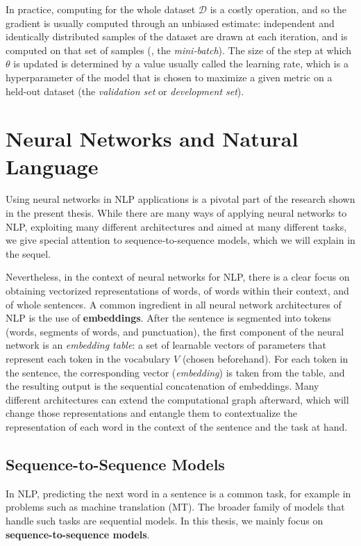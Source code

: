 In practice, computing  for the whole dataset
$\mathcal D$ is a costly operation, and so the gradient is usually
computed through an unbiased estimate: independent and identically
distributed samples of the dataset are drawn at each iteration, and 
is computed on that set of samples (\ie, the \textit{mini-batch}).
The size of the step at which $\theta$ is updated is determined by a value usually called the learning rate,
which is a hyperparameter of the model that is chosen to maximize a given metric on a held-out
dataset (the \textit{validation set} or \textit{development set}).

\section{Neural Networks and Natural Language}

\noindent Using neural networks in NLP applications is a pivotal part
of the research shown in the present thesis. While there are many
ways of applying neural networks to NLP, exploiting many different
architectures and aimed at many different tasks, we give
special attention to sequence-to-sequence models, which we will
explain in the sequel.

Nevertheless, in the context of neural networks for NLP, there is a
clear focus on obtaining vectorized representations of words, of words
within their context, and of whole sentences. A common ingredient in all
neural network architectures of NLP is the use of
\textbf{embeddings}. After the sentence is segmented into tokens
(words, segments of words, and punctuation), the first component of the
neural network is an \textit{embedding table}: a set of learnable
vectors of parameters that represent each token in the vocabulary $V$
(chosen beforehand). For each token in the sentence, the
corresponding vector (\textit{embedding}) is taken from the table,
and the resulting output is the sequential concatenation of
embeddings. Many different architectures can extend the computational
graph afterward, which will change those representations and entangle
them to contextualize the representation of each word in the context
of the sentence and the task at hand.

\subsection{Sequence-to-Sequence Models}

\noindent In NLP, predicting the next word in a sentence is a common
task, for example in problems such as machine translation (MT). The
broader family of models that handle such tasks are sequential
models. In this thesis, we mainly focus on
\textbf{sequence-to-sequence models}.

